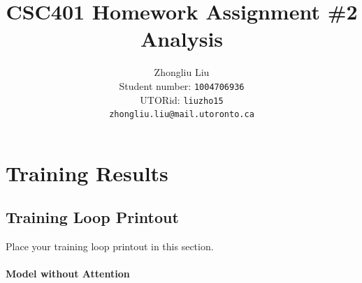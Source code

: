 \documentclass[11pt]{article}
\title{CSC401 Homework Assignment \#2\\Analysis}
\author{Zhongliu Liu \\
  Student number: \texttt{1004706936} \\
  UTORid: \texttt{liuzho15} \\
  \texttt{zhongliu.liu@mail.utoronto.ca}}
\begin{document}
\maketitle

\section{Training Results}

\subsection{Training Loop Printout}
Place your training loop printout in this section.

\paragraph{Model without Attention}
\end{document}
